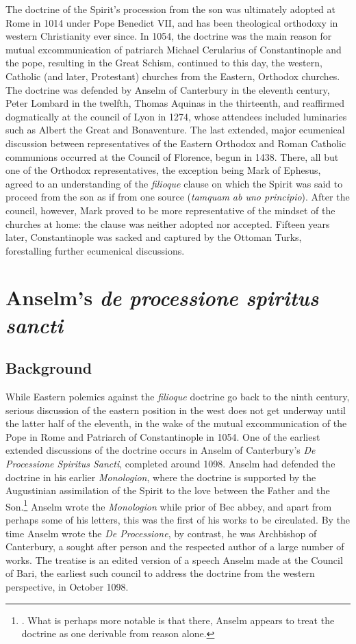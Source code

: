 \documentclass[]{article}
\begin{document}
The doctrine of the Spirit's procession from the son was ultimately adopted at Rome in 1014 under Pope Benedict VII, and has been theological orthodoxy in western Christianity ever since. In 1054, the doctrine was the main reason for mutual excommunication of patriarch Michael Cerularius of Constantinople and the pope, resulting in the Great Schism, continued to this day, the western, Catholic (and later, Protestant) churches from the Eastern, Orthodox churches. The doctrine was defended by Anselm of Canterbury in the eleventh century, Peter Lombard in the twelfth, Thomas Aquinas in the thirteenth, and reaffirmed dogmatically at the council of Lyon in 1274, whose attendees included luminaries such as Albert the Great and Bonaventure. The last extended, major ecumenical discussion between representatives of the Eastern Orthodox and Roman Catholic communions occurred at the Council of Florence, begun in 1438. There, all but one of the Orthodox representatives, the exception being Mark of Ephesus, agreed to an understanding of the \textit{filioque} clause on which the Spirit was said to proceed from the son as if from one source (\textit{tamquam ab uno principio}). After the council, however, Mark proved to be more representative of the mindset of the churches at home: the clause was neither adopted nor accepted. Fifteen years later, Constantinople was sacked and captured by the Ottoman Turks, forestalling further ecumenical discussions.

\section{Anselm's \textit{de processione spiritus sancti}}
\subsection{Background}
While Eastern polemics against the \textit{filioque} doctrine go back to the ninth century, serious discussion of the eastern position in the west does not get underway until the latter half of the eleventh, in the wake of the mutual excommunication of the Pope in Rome and Patriarch of Constantinople in 1054. One of the earliest extended discussions of the doctrine occurs in Anselm of Canterbury's \textit{De Processione Spiritus Sancti}, completed around 1098. Anselm had defended the doctrine in his earlier \textit{Monologion}, where the doctrine is supported by the Augustinian assimilation of the Spirit to the love between the Father and the Son.\footnote{\autocite[ch. 57]{AnselmMonologion}. What is perhaps more notable is that there, Anselm appears to treat the doctrine as one derivable from reason alone.} Anselm wrote the \textit{Monologion} while prior of Bec abbey, and apart from perhaps some of his letters, this was the first of his works to be circulated.\autocite{Sharpe2009} By the time Anselm wrote the \textit{De Processione}, by contrast, he was Archbishop of Canterbury, a sought after person and the respected author of a large number of works.\autocite[Bk. 2, ch. 5, par. 46-48]{VA} The treatise is an edited version of a speech Anselm made at the Council of Bari, the earliest such council to address the doctrine from the western perspective, in October 1098.
\end{document}
